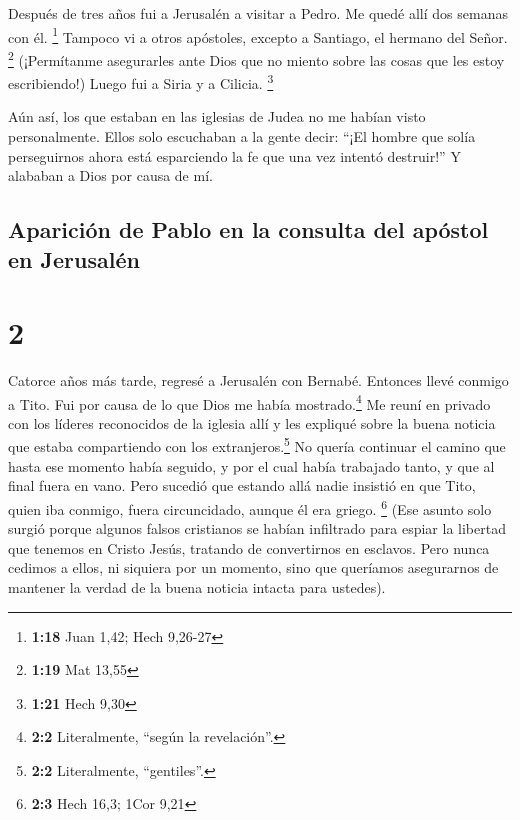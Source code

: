  Después de tres años fui a Jerusalén a visitar a Pedro.
Me quedé allí dos semanas con él. \footnote{\textbf{1:18} Juan 1,42;
  Hech 9,26-27}  Tampoco vi a otros apóstoles, excepto a
Santiago, el hermano del Señor. \footnote{\textbf{1:19} Mat 13,55}
 (¡Permítanme asegurarles ante Dios que no miento sobre
las cosas que les estoy escribiendo!)  Luego fui a Siria
y a Cilicia. \footnote{\textbf{1:21} Hech 9,30}

 Aún así, los que estaban en las iglesias de Judea no me
habían visto personalmente.  Ellos solo escuchaban a la
gente decir: ``¡El hombre que solía perseguirnos ahora está esparciendo
la fe que una vez intentó destruir!''  Y alababan a Dios
por causa de mí.

\hypertarget{apariciuxf3n-de-pablo-en-la-consulta-del-apuxf3stol-en-jerusaluxe9n}{%
\subsection{Aparición de Pablo en la consulta del apóstol en
Jerusalén}\label{apariciuxf3n-de-pablo-en-la-consulta-del-apuxf3stol-en-jerusaluxe9n}}

\hypertarget{section-1}{%
\section{2}\label{section-1}}

 Catorce años más tarde, regresé a Jerusalén con Bernabé.
Entonces llevé conmigo a Tito.  Fui por causa de lo que
Dios me había mostrado.\footnote{\textbf{2:2} Literalmente, ``según la
  revelación''.} Me reuní en privado con los líderes reconocidos de la
iglesia allí y les expliqué sobre la buena noticia que estaba
compartiendo con los extranjeros.\footnote{\textbf{2:2} Literalmente,
  ``gentiles''.} No quería continuar el camino que hasta ese momento
había seguido, y por el cual había trabajado tanto, y que al final fuera
en vano.  Pero sucedió que estando allá nadie insistió en
que Tito, quien iba conmigo, fuera circuncidado, aunque él era griego.
\footnote{\textbf{2:3} Hech 16,3; 1Cor 9,21}  (Ese asunto
solo surgió porque algunos falsos cristianos se habían infiltrado para
espiar la libertad que tenemos en Cristo Jesús, tratando de convertirnos
en esclavos.  Pero nunca cedimos a ellos, ni siquiera por
un momento, sino que queríamos asegurarnos de mantener la verdad de la
buena noticia intacta para ustedes).

